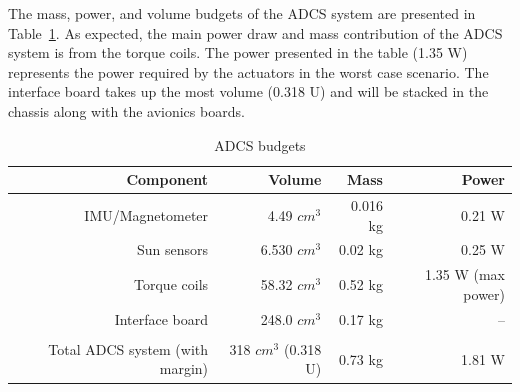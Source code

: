 \documentclass[12pt]{article}
\begin{document}
			The mass, power, and volume budgets of the ADCS system are presented in Table~\ref{tab:ADCS_budget}. As expected, the main power draw and mass contribution of the ADCS system is from the torque coils. The power presented in the table (1.35 W) represents the power required by the actuators in the worst case scenario. The interface board takes up the most volume (0.318 U) and will be stacked in the chassis along with the avionics boards. 

\begin{table}[htbp]
  \centering
  \caption{ADCS budgets}
    \begin{tabular}{|r|r|r|r|}
    \hline
    \textbf{Component} & \textbf{Volume} & \textbf{Mass} & \textbf{Power} \bigstrut\\
    \hline
    IMU/Magnetometer & 4.49 $cm^3$ & 0.016 kg & 0.21 W \bigstrut\\
    \hline
    Sun sensors & 6.530 $cm^3$ & 0.02 kg & 0.25 W \bigstrut\\
    \hline
    Torque coils & 58.32 $cm^3$ & 0.52 kg & 1.35 W (max power)\bigstrut\\
    \hline
    Interface board & 248.0 $cm^3$ & 0.17 kg & -- \bigstrut\\
    \hline
    \multicolumn{1}{r}{} & \multicolumn{1}{r}{} & \multicolumn{1}{r}{} & \multicolumn{1}{r}{} \bigstrut\\
    \hline
    Total ADCS system (with margin) & 318 $cm^3$ (0.318 U) & 0.73 kg & 1.81 W \bigstrut\\
    \hline
    \end{tabular}%
  \label{tab:ADCS_budget}%
\end{table}%
\end{document}
